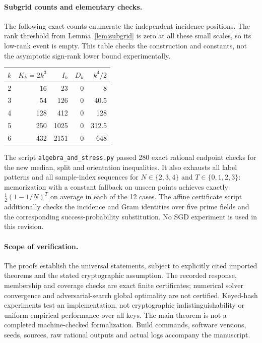 \documentclass[11pt]{article}
\newcommand{\1}{\mathbf 1}
\begin{document}
\paragraph{Subgrid counts and elementary checks.}
The following exact counts enumerate the independent incidence positions. The rank threshold from Lemma~\ref{lem:subgrid} is zero at all these small scales, so its low-rank event is empty. This table checks the construction and constants, not the asymptotic sign-rank lower bound experimentally.
\begin{center}
\begin{tabular}{rrrrr}
\toprule
$k$&$K_k=2k^3$&$I_k$&$D_k$&$k^4/2$\\
\midrule
2&16&23&0&8\\
3&54&126&0&40.5\\
4&128&412&0&128\\
5&250&1025&0&312.5\\
6&432&2151&0&648\\
\bottomrule
\end{tabular}
\end{center}
The script \texttt{algebra\_and\_stress.py} passed 280 exact rational endpoint checks for the new median, split and orientation inequalities. It also exhausts all label patterns and all sample-index sequences for $N\in\{2,3,4\}$ and $T\in\{0,1,2,3\}$: memorization with a constant fallback on unseen points achieves exactly $\tfrac12(1-1/N)^T$ on average in each of the 12 cases. The affine certificate script additionally checks the incidence and Gram identities over five prime fields and the corresponding success-probability substitution. No SGD experiment is used in this revision.

\paragraph{Scope of verification.}
The proofs establish the universal statements, subject to explicitly cited imported theorems and the stated cryptographic assumption. The recorded response, membership and coverage checks are exact finite certificates; numerical solver convergence and adversarial-search global optimality are not certified. Keyed-hash experiments test an implementation, not cryptographic indistinguishability or uniform empirical performance over all keys. The main theorem is not a completed machine-checked formalization. Build commands, software versions, seeds, sources, raw rational outputs and actual logs accompany the manuscript.
\end{document}
